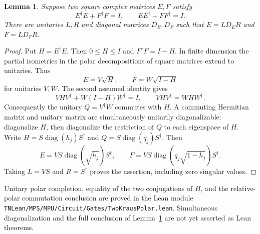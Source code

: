 \documentclass[11pt]{article}
\newtheorem{lemma}{Lemma}
\begin{document}
\begin{lemma}\label{lem:two-kraus}
Suppose two square complex matrices $E,F$ satisfy
\[
 E^\dagger E+F^\dagger F=I,
 \qquad EE^\dagger+FF^\dagger=I.
\]
There are unitaries $L,R$ and diagonal matrices $D_E,D_F$ such that
$E=LD_ER$ and $F=LD_FR$.
\end{lemma}
\begin{proof}
Put $H=E^\dagger E$. Then $0\leq H\leq I$ and
$F^\dagger F=I-H$. In finite dimension the partial isometries in the
polar decompositions of square matrices extend to unitaries. Thus
\[
 E=V\sqrt H,\qquad F=W\sqrt{I-H}
\]
for unitaries $V,W$. The second assumed identity gives
\[
 VHV^\dagger+W(I-H)W^\dagger=I,
 \qquad VHV^\dagger=WHW^\dagger.
\]
Consequently the unitary $Q=V^\dagger W$ commutes with $H$.
A commuting Hermitian matrix and unitary matrix are simultaneously
unitarily diagonalizable: diagonalize $H$, then diagonalize the
restriction of $Q$ to each eigenspace of $H$. Write
$H=S\operatorname{diag}(h_j)S^\dagger$ and
$Q=S\operatorname{diag}(q_j)S^\dagger$. Then
\[
 E=VS\operatorname{diag}(\sqrt{h_j})S^\dagger,
 \qquad
 F=VS\operatorname{diag}(q_j\sqrt{1-h_j})S^\dagger.
\]
Taking $L=VS$ and $R=S^\dagger$ proves the assertion, including zero
singular values.
\end{proof}

Unitary polar completion, equality of the two conjugations of $H$, and
the relative-polar commutation conclusion are proved in the Lean module
\nolinkurl{TNLean/MPS/MPU/Circuit/Gates/TwoKrausPolar.lean}. Simultaneous
diagonalization and the full conclusion of Lemma~\ref{lem:two-kraus}
are not yet asserted as Lean theorems.
\end{document}
